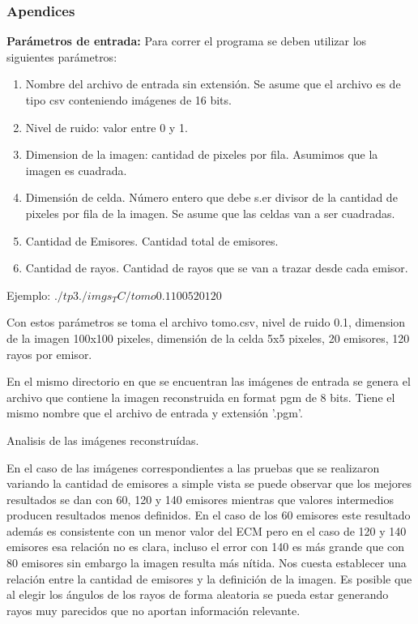 \subsubsection*{Apendices}

\textbf{Parámetros de entrada:} Para correr el programa se deben utilizar los siguientes parámetros:
\begin{enumerate}
\item Nombre del archivo de entrada sin extensión. Se asume que el archivo es de tipo csv conteniendo imágenes de 16 bits.
\item Nivel de ruido: valor entre 0 y 1.
\item Dimension de la imagen: cantidad de pixeles por fila. Asumimos que la imagen es cuadrada.
\item Dimensión de celda. Número entero que debe s.er divisor de la cantidad de pixeles por fila de la imagen. Se asume que las celdas van a ser cuadradas.
\item Cantidad de Emisores. Cantidad total de emisores.
\item Cantidad de rayos. Cantidad de rayos que se van a trazar desde cada emisor.
\end{enumerate}
\par Ejemplo: $./tp3 ./imgs_TC/tomo 0.1 100 5 20 120$
\par Con estos parámetros se toma el archivo tomo.csv, nivel de ruido 0.1, dimension de la imagen 100x100 pixeles, dimensión de la celda 5x5 pixeles, 20 emisores, 120 rayos por emisor.

\par En el mismo directorio en que se encuentran las imágenes de entrada se genera el archivo que contiene la imagen reconstruida en format pgm de 8 bits. Tiene el mismo nombre que el archivo de entrada y extensión '.pgm'.

Analisis de las imágenes reconstruídas.

En el caso de las imágenes correspondientes a las pruebas que se realizaron variando la cantidad de emisores a simple vista se puede observar que los mejores resultados se dan con 60, 120 y 140 emisores mientras que valores intermedios producen resultados menos definidos. En el caso de los 60 emisores este resultado además es consistente con un menor valor del ECM pero en el caso de 120 y 140 emisores esa relación no es clara, incluso el error con 140 es más grande que con 80 emisores sin embargo la imagen resulta más nítida. Nos cuesta establecer una relación entre la cantidad de emisores y la definición de la imagen. Es posible que al elegir los ángulos de los rayos de forma aleatoria se pueda estar generando rayos muy parecidos que no aportan información relevante.

